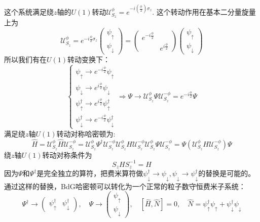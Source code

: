 \documentclass[a4paper]{article}
\numberwithin{equation}{subsection}
\newcommand{\mU}{\mathcal{U}}
\begin{document}
这个系统满足绕$z$轴的$U(1)$转动$\mU_{S_z}^\phi=e^{-i(\frac{\phi}{2})\sigma_z}$. 这个转动作用在基本二分量旋量上为
\begin{equation}
    \mU_{S_z}^{\phi}=e^{-i\frac{\phi}{2}\sigma_z}\begin{pmatrix}
        \psi_\uparrow\\
        \psi_\downarrow
    \end{pmatrix}=\begin{pmatrix}
        e^{-i\frac{\phi}{2}}\\
        &e^{i\frac{\phi}{2}}
    \end{pmatrix}\begin{pmatrix}
        \psi_\uparrow\\
        \psi_\downarrow
    \end{pmatrix}
\end{equation}
所以我们有在$U(1)$转动变换下：
\begin{equation}
    \begin{cases}
        \psi_\uparrow\rightarrow e^{-i\frac{\phi}{2}}\psi_\uparrow\\
        \psi_\downarrow\rightarrow e^{i\frac{\phi}{2}}\psi_\downarrow\\
        \psi_\uparrow^\dagger\rightarrow e^{i\frac{\phi}{2}}\psi_\uparrow^\dagger\\
        \psi_\downarrow^\dagger\rightarrow e^{-i\frac{\phi}{2}}\psi_\downarrow^\dagger
    \end{cases}\Rightarrow\Psi\rightarrow\mU_{S_z}^\phi\Psi\mU_{S_z}^{-\phi}= e^{-i\frac{\phi}{2}}\Psi
\end{equation}
满足绕$z$轴$U(1)$转动对称哈密顿为:
\begin{equation}
    \hat{H}=\mU_{S_z}^{\phi}\hat{H}\mU_{S_z}^{-\phi}=\mU_{S_z}^{\phi}\Psi^\dagger\mU_{S_z}^{-\phi}\mU_{S_z}^{\phi}H\mU_{S_z}^{-\phi}\mU_{S_z}^{\phi}\Psi\mU_{S_z}^{-\phi}=\Psi(\mU_{S_z}^{\phi}H\mU_{S_z}^{-\phi})\Psi
\end{equation}
绕$z$轴$U(1)$转动对称条件为
\begin{equation}
    S_zHS_z^{-1}=H
\end{equation}
因为$\Psi$和$\Psi^\dagger$是完全独立的算符，把费米算符做$\psi_{\downarrow}^\dagger\rightarrow \psi_\downarrow,\psi_{\downarrow}\rightarrow\psi_\downarrow^\dagger$的替换是可能的。通过这样的替换，BdG哈密顿可以转化为一个正常的粒子数守恒费米子系统：
\begin{equation}
    \Psi^\dagger\rightarrow\begin{pmatrix}
        \psi_\uparrow^\dagger&\psi_\downarrow^\dagger
    \end{pmatrix},\quad \Psi\rightarrow\begin{pmatrix}
        \psi_\uparrow\\
        \psi_\downarrow
    \end{pmatrix},\quad [\hat{H},\hat{N}]=0,\quad \hat{N}=\psi_\uparrow^\dagger\psi_\uparrow+\psi_\downarrow^\dagger\psi_\downarrow
\end{equation}
\end{document}
